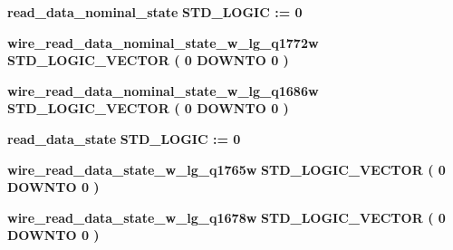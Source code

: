 \begin{DoxyCompactItemize}
\item 
{\bf read\+\_\+data\+\_\+nominal\+\_\+state} {\bfseries \textcolor{comment}{S\+T\+D\+\_\+\+L\+O\+G\+IC}\textcolor{vhdlchar}{ }\textcolor{vhdlchar}{ }\textcolor{vhdlchar}{\+:}\textcolor{vhdlchar}{=}\textcolor{vhdlchar}{ }\textcolor{vhdlchar}{ }\textcolor{vhdlchar}{\textquotesingle{}}\textcolor{vhdlchar}{ } \textcolor{vhdldigit}{0} \textcolor{vhdlchar}{ }\textcolor{vhdlchar}{\textquotesingle{}}\textcolor{vhdlchar}{ }} 
\item 
{\bf wire\+\_\+read\+\_\+data\+\_\+nominal\+\_\+state\+\_\+w\+\_\+lg\+\_\+q1772w} {\bfseries \textcolor{comment}{S\+T\+D\+\_\+\+L\+O\+G\+I\+C\+\_\+\+V\+E\+C\+T\+OR}\textcolor{vhdlchar}{ }\textcolor{vhdlchar}{(}\textcolor{vhdlchar}{ }\textcolor{vhdlchar}{ } \textcolor{vhdldigit}{0} \textcolor{vhdlchar}{ }\textcolor{keywordflow}{D\+O\+W\+N\+TO}\textcolor{vhdlchar}{ }\textcolor{vhdlchar}{ } \textcolor{vhdldigit}{0} \textcolor{vhdlchar}{ }\textcolor{vhdlchar}{)}\textcolor{vhdlchar}{ }} 
\item 
{\bf wire\+\_\+read\+\_\+data\+\_\+nominal\+\_\+state\+\_\+w\+\_\+lg\+\_\+q1686w} {\bfseries \textcolor{comment}{S\+T\+D\+\_\+\+L\+O\+G\+I\+C\+\_\+\+V\+E\+C\+T\+OR}\textcolor{vhdlchar}{ }\textcolor{vhdlchar}{(}\textcolor{vhdlchar}{ }\textcolor{vhdlchar}{ } \textcolor{vhdldigit}{0} \textcolor{vhdlchar}{ }\textcolor{keywordflow}{D\+O\+W\+N\+TO}\textcolor{vhdlchar}{ }\textcolor{vhdlchar}{ } \textcolor{vhdldigit}{0} \textcolor{vhdlchar}{ }\textcolor{vhdlchar}{)}\textcolor{vhdlchar}{ }} 
\item 
{\bf read\+\_\+data\+\_\+state} {\bfseries \textcolor{comment}{S\+T\+D\+\_\+\+L\+O\+G\+IC}\textcolor{vhdlchar}{ }\textcolor{vhdlchar}{ }\textcolor{vhdlchar}{\+:}\textcolor{vhdlchar}{=}\textcolor{vhdlchar}{ }\textcolor{vhdlchar}{ }\textcolor{vhdlchar}{\textquotesingle{}}\textcolor{vhdlchar}{ } \textcolor{vhdldigit}{0} \textcolor{vhdlchar}{ }\textcolor{vhdlchar}{\textquotesingle{}}\textcolor{vhdlchar}{ }} 
\item 
{\bf wire\+\_\+read\+\_\+data\+\_\+state\+\_\+w\+\_\+lg\+\_\+q1765w} {\bfseries \textcolor{comment}{S\+T\+D\+\_\+\+L\+O\+G\+I\+C\+\_\+\+V\+E\+C\+T\+OR}\textcolor{vhdlchar}{ }\textcolor{vhdlchar}{(}\textcolor{vhdlchar}{ }\textcolor{vhdlchar}{ } \textcolor{vhdldigit}{0} \textcolor{vhdlchar}{ }\textcolor{keywordflow}{D\+O\+W\+N\+TO}\textcolor{vhdlchar}{ }\textcolor{vhdlchar}{ } \textcolor{vhdldigit}{0} \textcolor{vhdlchar}{ }\textcolor{vhdlchar}{)}\textcolor{vhdlchar}{ }} 
\item 
{\bf wire\+\_\+read\+\_\+data\+\_\+state\+\_\+w\+\_\+lg\+\_\+q1678w} {\bfseries \textcolor{comment}{S\+T\+D\+\_\+\+L\+O\+G\+I\+C\+\_\+\+V\+E\+C\+T\+OR}\textcolor{vhdlchar}{ }\textcolor{vhdlchar}{(}\textcolor{vhdlchar}{ }\textcolor{vhdlchar}{ } \textcolor{vhdldigit}{0} \textcolor{vhdlchar}{ }\textcolor{keywordflow}{D\+O\+W\+N\+TO}\textcolor{vhdlchar}{ }\textcolor{vhdlchar}{ } \textcolor{vhdldigit}{0} \textcolor{vhdlchar}{ }\textcolor{vhdlchar}{)}\textcolor{vhdlchar}{ }} 

\end{DoxyCompactItemize}
